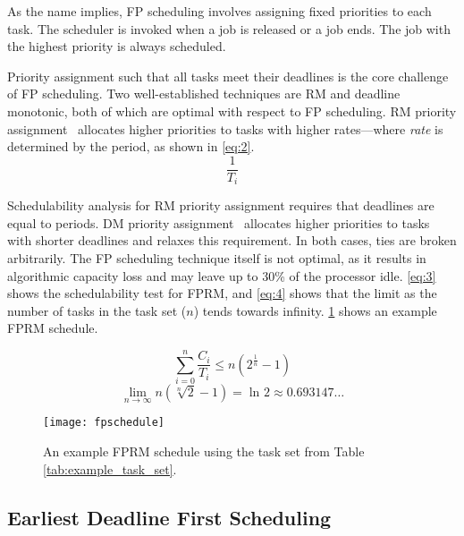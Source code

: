 As the name implies, \gls{FP} scheduling involves assigning fixed priorities to each task.
The scheduler is invoked when a job is released or a job ends.
The job with the highest priority is always scheduled.

Priority assignment such that all tasks meet their deadlines is the core challenge of \gls{FP} scheduling.
Two well-established techniques are \gls{RM} and deadline monotonic, both of which are optimal with respect to \gls{FP} scheduling.
\Gls{RM} priority assignment~\citep{Liu_Layland_73} allocates higher priorities to tasks with higher
rates---where \emph{rate} is determined by the period, as shown in \cref{eq:2}.
\begin{equation}
    \label{eq:2}
	\dfrac{1}{T_{i}}
\end{equation}

Schedulability analysis for \gls{RM} priority assignment requires that deadlines are equal to periods.
\Gls{DM} priority assignment~\citep{Leung_Whitehead_82} allocates higher priorities to tasks with shorter deadlines and relaxes this requirement.
In both cases, ties are broken arbitrarily.
The \gls{FP} scheduling technique itself is not optimal, as it results in algorithmic capacity loss
and may leave up to 30\% of the processor idle. \cref{eq:3} shows the schedulability test for
\gls{FPRM}, and \cref{eq:4} shows that the limit as the number of tasks in the task set ($n$) tends
towards infinity.
\cref{f:fp-schedule} shows an example \gls{FPRM} schedule.

\begin{equation}
    \label{eq:3}
    \sum\limits_{i=0}^n \dfrac{C_{i}}{T_{i}} \leq n(2^{\frac{1}{n}}-1)
\end{equation}
\begin{equation}
    \label{eq:4}
    \lim_{n \to \infty}n(\sqrt[n]{2}-1) = \ln_{} 2 \approx 0.693147\ldots
\end{equation}

\begin{figure}
	\begin{center}
		\leavevmode
		\texttt{[image: fpschedule]}
		\caption{An example FPRM schedule using the task set from Table \ref{tab:example_task_set}.}
		\label{f:fp-schedule}
	\end{center}
\end{figure}

\subsection{Earliest Deadline First Scheduling}

